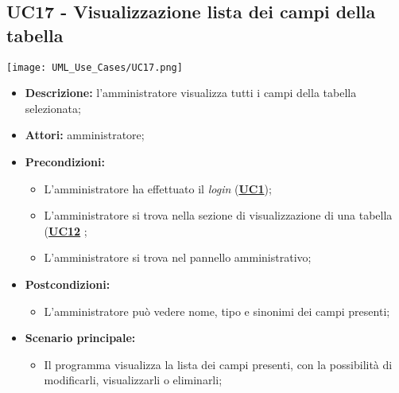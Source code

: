 \subsection{UC17 - Visualizzazione lista dei campi della tabella}
\label{sec:UC17}
\texttt{[image: UML\_Use\_Cases/UC17.png]}
\begin{itemize}
	\item \textbf{Descrizione:} l’amministratore visualizza tutti i campi della tabella selezionata;
	\item \textbf{Attori:} amministratore;
	\item \textbf{Precondizioni:} 
	\begin{itemize}
		\item L’amministratore ha effettuato il \textit{login} (\hyperref[sec:UC1]{\textbf{UC1}});
		\item L’amministratore si trova nella sezione di visualizzazione di una tabella (\hyperref[sec:UC12]{\textbf{UC12}} ;
		\item L’amministratore si trova nel pannello amministrativo;
	\end{itemize}
	\item \textbf{Postcondizioni:} 
	\begin{itemize}
		\item L'amministratore può vedere nome, tipo e sinonimi dei campi presenti;
	\end{itemize}
	\item \textbf{Scenario principale:} 
	\begin{itemize}
		\item Il programma visualizza la lista dei campi presenti, con la possibilità di modificarli, visualizzarli o eliminarli;
	\end{itemize}
\end{itemize}

